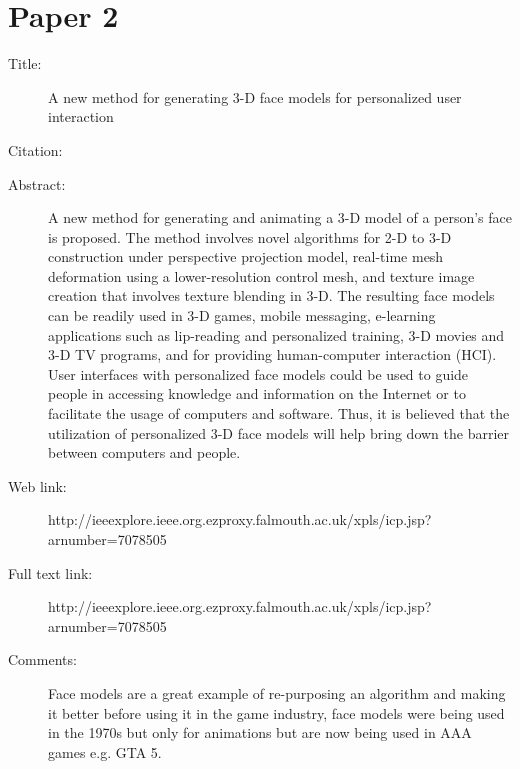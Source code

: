 \documentclass{scrartcl}
\begin{document}
\section*{Paper 2}
\begin{description}
\item[Title:] A new method for generating 3-D face models for personalized user interaction
\item[Citation:] \cite{erdem2005new}
\item[Abstract:] A new method for generating and animating a 3-D model of a person's face is proposed. The method involves novel algorithms for 2-D to 3-D construction under perspective projection model, real-time mesh deformation using a lower-resolution control mesh, and texture image creation that involves texture blending in 3-D. The resulting face models can be readily used in 3-D games, mobile messaging, e-learning applications such as lip-reading and personalized training, 3-D movies and 3-D TV programs, and for providing human-computer interaction (HCI). User interfaces with personalized face models could be used to guide people in accessing knowledge and information on the Internet or to facilitate the usage of computers and software. Thus, it is believed that the utilization of personalized 3-D face models will help bring down the barrier between computers and people.
\item[Web link:] http://ieeexplore.ieee.org.ezproxy.falmouth.ac.uk/xpls/icp.jsp?arnumber=7078505
\item[Full text link:] http://ieeexplore.ieee.org.ezproxy.falmouth.ac.uk/xpls/icp.jsp?arnumber=7078505
\item[Comments:] Face models are a great example of re-purposing an algorithm and making it better before using it in the game industry, face models were being used in the 1970s but only for animations but are now being used in AAA games e.g. GTA 5.
\end{description}
\end{document}
